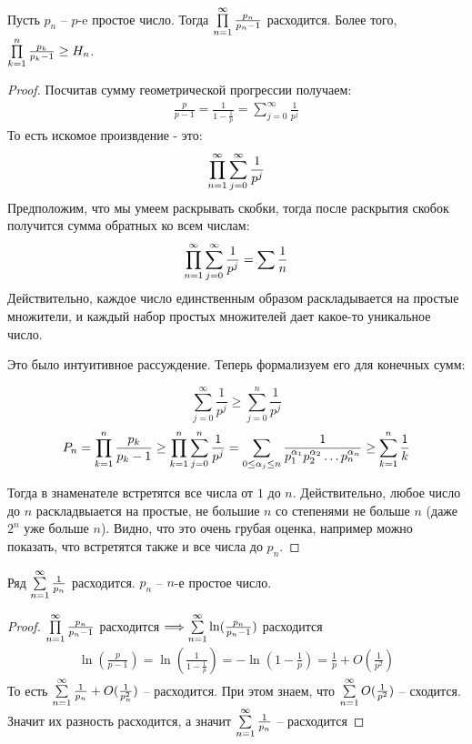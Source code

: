 Пусть $p_n$ -- $p$-e простое число. Тогда $\prod \limits_{n=1}^\infty \frac{p_n}{p_n - 1}$ расходится.
Более того, $\prod \limits_{k=1}^n \frac{p_k}{p_k - 1} \geq H_n$.

\begin{proof}
    Посчитав сумму геометрической прогрессии получаем:
    \begin{gather*}
        \frac{p}{p-1} = \frac{1}{1-\frac{1}{p}} = \sum \limits_{j=0}^\infty \frac{1}{p^j}
    \end{gather*}
    То есть искомое произвдение - это:
    \begin{gather*}
        \prod \limits_{n=1}^\infty \sum \limits_{j=0}^\infty \frac{1}{p^j}
    \end{gather*}
    Предположим, что мы умеем раскрывать скобки, тогда после раскрытия скобок получится сумма обратных ко всем числам:
    \begin{gather*}
        \prod \limits_{n=1}^\infty \sum \limits_{j=0}^\infty \frac{1}{p^j} = \sum \frac{1}{n}
    \end{gather*}
    Действительно, каждое число единственным образом раскладывается на простые множители, и каждый набор простых множителей дает какое-то уникальное число.

    Это было интуитивное рассуждение. Теперь формализуем его для конечных сумм:

    \[\sum \limits_{j=0}^\infty \frac{1}{p^j} \geq \sum \limits_{j=0}^n \frac{1}{p^j}\]
    \[P_n = \prod \limits_{k=1}^n \frac{p_k}{p_k - 1} \geq \prod \limits_{k=1}^n \sum \limits_{j=0}^n \frac{1}{p^j} = 
    \sum_{0 \leq \alpha_j \leq n} \frac{1}{p_1^{\alpha_1}p_2^{\alpha_2}\ldots p_n^{\alpha_n}} \geq \sum \limits_{k=1}^n \frac{1}{k} \]

    Тогда в знаменателе встретятся все числа от $1$ до $n$. Действительно, любое число до $n$ раскладвыается на простые,
    не большие $n$ со степенями не больше $n$ (даже $2^n$ уже больше $n$). Видно, что это очень грубая оценка, например можно
    показать, что встретятся также и все числа до $p_n$.
\end{proof}

\begin{theorem}
    Ряд $\sum \limits_{n=1}^\infty \frac{1}{p_n}$ расходится. $p_n$ -- $n$-е простое число.
\end{theorem}

\begin{proof}
    $\prod \limits_{n=1}^\infty \frac{p_n}{p_n - 1}$ расходится $\Longrightarrow \sum \limits_{n=1}^\infty \ln(\frac{p_n}{p_n-1})$ расходится
    \begin{gather*}
        \ln(\frac{p}{p-1}) = \ln(\frac{1}{1-\frac{1}{p}}) = -\ln(1 - \frac{1}{p}) = \frac{1}{p} + O(\frac{1}{p^2})
    \end{gather*}
    То есть $\sum \limits_{n=1}^\infty \frac{1}{p_n} + O(\frac{1}{p_n^2})$ -- расходится. При этом знаем, что $\sum \limits_{n=1}^\infty O(\frac{1}{p^2})$ -- сходится.
    Значит их разность расходится, а значит $\sum \limits_{n=1}^\infty \frac{1}{p_n}$ -- расходится
\end{proof}

